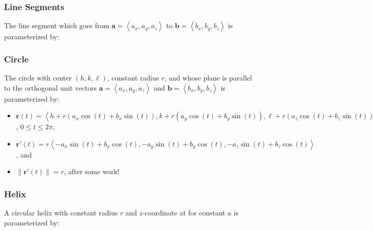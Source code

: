 \documentclass[10pt]{article}
\newcommand{\mb}[1]{\mathbf{#1}}
\newcommand{\brackett}[1]{\left\langle #1 \right\rangle}
\newcommand{\vecfuc}[2]{\mb{#1}(#2)}
\newcommand{\dvecfuc}[2]{\mb{#1}'(#2)}
\newcommand{\normdvecfuc}[2]{\| \mb{#1}'(#2) \|}
\newcommand{\mysqrt}[1]{%
  \mathpalette\foo{#1}%
}
\newcommand{\foo}[2]{%
  \sbox0{$#1\sqrt{#2}$}%
  \begin{tikzpicture}[baseline=(sqrt.base)]
    \node[inner sep=0, outer sep=0] (sqrt) {$#1\sqrt{#2}$}; %
    \draw([yshift=-0.045em]sqrt.north east) -- ++(0,-0.5ex); %
  \end{tikzpicture}%
}
\begin{document}
\subsubsection*{Line Segments}

The line segment which goes from \(\mb{a} = \brackett{a_{x}, a_{y}, a_{z}}\) to \(\mb{b} = \brackett{b_{x}, b_{y}, b_{z}}\) is parameterized by:

\subsubsection*{Circle}

The circle with center \((h,k,\ell)\), constant radius \(r\), and whose plane is parallel to the orthogonal unit vectors \(\mb{a} = \brackett{a_{x}, a_{y}, a_{z}}\) and \(\mb{b} = \brackett{b_{x}, b_{y}, b_{z}}\) is parameterized by:
\begin{itemize}
    \item \(\vecfuc{r}{t} = \brackett{h + r (a_{x} \cos(t) + b_{x} \sin(t)), k + r (a_{y} \cos(t) + b_{y} \sin(t)), \ell + r (a_{z} \cos(t) + b_{z} \sin(t))}\), \(0 \leq t \leq 2\pi\),
    \item \(\dvecfuc{r}{t} = r\brackett{-a_{x} \sin(t) + b_{x} \cos(t), -a_{y} \sin(t) + b_{y} \cos(t), -a_{z} \sin(t) + b_{z} \cos(t)}\), and
    \item \(\normdvecfuc{r}{t} = r\), after some work!
\end{itemize}

\subsubsection*{Helix}

A circular helix with constant radius \(r\) and \(z\)-coordinate at for constant \(a\) is parameterized by:
\end{document}
